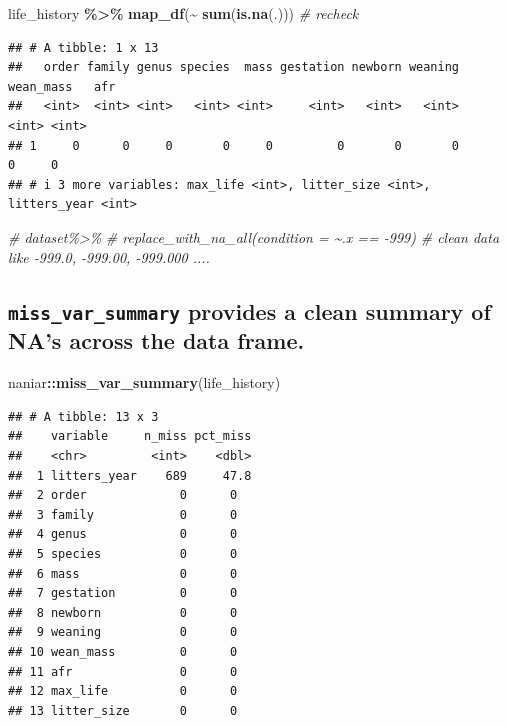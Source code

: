 \documentclass[
]{article}
\newenvironment{Shaded}{\begin{snugshade}}{\end{snugshade}}
\newcommand{\CommentTok}[1]{\textcolor[rgb]{0.56,0.35,0.01}{\textit{#1}}}
\newcommand{\FunctionTok}[1]{\textcolor[rgb]{0.13,0.29,0.53}{\textbf{#1}}}
\newcommand{\NormalTok}[1]{#1}
\newcommand{\SpecialCharTok}[1]{\textcolor[rgb]{0.81,0.36,0.00}{\textbf{#1}}}
\begin{document}
\begin{Shaded}
\begin{Highlighting}[]
\NormalTok{life\_history }\SpecialCharTok{\%\textgreater{}\%} \FunctionTok{map\_df}\NormalTok{(}\SpecialCharTok{\textasciitilde{}} \FunctionTok{sum}\NormalTok{(}\FunctionTok{is.na}\NormalTok{(.))) }\CommentTok{\# recheck}
\end{Highlighting}
\end{Shaded}

\begin{verbatim}
## # A tibble: 1 x 13
##   order family genus species  mass gestation newborn weaning wean_mass   afr
##   <int>  <int> <int>   <int> <int>     <int>   <int>   <int>     <int> <int>
## 1     0      0     0       0     0         0       0       0         0     0
## # i 3 more variables: max_life <int>, litter_size <int>, litters_year <int>
\end{verbatim}

\begin{Shaded}
\begin{Highlighting}[]
\CommentTok{\# dataset\%\textgreater{}\%}
  \CommentTok{\# replace\_with\_na\_all(condition = \textasciitilde{}.x == {-}999) }
\CommentTok{\# clean data like {-}999.0, {-}999.00, {-}999.000 .... }
\end{Highlighting}
\end{Shaded}

\hypertarget{miss_var_summary-provides-a-clean-summary-of-nas-across-the-data-frame.}{%
\subsection{\texorpdfstring{\texttt{miss\_var\_summary} provides a clean
summary of NA's across the data
frame.}{miss\_var\_summary provides a clean summary of NA's across the data frame.}}\label{miss_var_summary-provides-a-clean-summary-of-nas-across-the-data-frame.}}

\begin{Shaded}
\begin{Highlighting}[]
\NormalTok{naniar}\SpecialCharTok{::}\FunctionTok{miss\_var\_summary}\NormalTok{(life\_history) }
\end{Highlighting}
\end{Shaded}

\begin{verbatim}
## # A tibble: 13 x 3
##    variable     n_miss pct_miss
##    <chr>         <int>    <dbl>
##  1 litters_year    689     47.8
##  2 order             0      0  
##  3 family            0      0  
##  4 genus             0      0  
##  5 species           0      0  
##  6 mass              0      0  
##  7 gestation         0      0  
##  8 newborn           0      0  
##  9 weaning           0      0  
## 10 wean_mass         0      0  
## 11 afr               0      0  
## 12 max_life          0      0  
## 13 litter_size       0      0
\end{verbatim}
\end{document}
